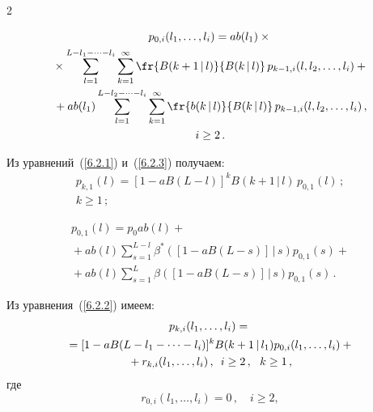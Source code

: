 \begin{multicols}{2}
\vspace*{-9pt}

\noindent
\begin{multline}
p_{0,i}(l_1,\ldots,l_i)
= a b(l_1)\times{}\\
{}\times 
\sum\limits_{l=1}^{L-l_1-\cdots-l_i}
\sum\limits_{k=1}^\infty
\fr{B(k+1\,|\,l) }{ B(k\,|\,l)}\,
p_{k-1,i}(l,l_2,\ldots,l_i)
 +{}
\\
{}+
a b(l_1) \sum\limits_{l=1}^{L-l_2-\cdots-l_i}
\sum\limits_{k=1}^\infty
\fr{b(k\,|\,l) }{B(k\,|\,l)}\,
p_{k-1,i}(l,l_2,\ldots,l_i)\,,
\\
i \ge 2\,.
\label{6.2.4}
\end{multline}

Из уравнений~(\ref{6.2.1}) и~(\ref{6.2.3}) получаем:
\begin{multline}
\label{6.2.5}
p_{k,1}(l)=
[1 - a B(L-l)]^k B(k+1\,|\,l)
\,p_{0,1}(l)\,;
\\ 
k\ge 1\,;
\end{multline}

\vspace*{-9pt}

\noindent
\begin{multline}
\label{6.2.6}
p_{0,1}(l)= p_0 a b(l)+{}\\
{}+
a b(l)\sum\limits_{s=1}^{L-l}
\beta^*([1 - a B(L-s)]\,|\,s)
p_{0,1}(s)
 +{}
\\
{}+
a b(l)
\sum\limits_{s=1}^{L}
\beta([1 - a B(L-s)]\,|\,s)
p_{0,1}(s)\,.
\end{multline}

Из уравнения~(\ref{6.2.2}) имеем:
\begin{multline}
p_{k,i}(l_1,\ldots,l_i)
={}\\
{}=[1 - a B(L-l_1-\cdots-l_i)]^k
B(k+1\,|\,l_1) p_{0,i}(l_1,\ldots,l_i)
+{}
\\
{}+r_{k,i}(l_1,\ldots,l_i)\,,
\enskip
i \ge 2\,,\ \ k\ge 1\,,
\label{6.2.7}
\end{multline}
где
\begin{equation}
\label{6.2.8}
r_{0,i}(l_1,\ldots,l_i)
= 0\,,\quad
i \ge 2,
\end{equation}

\vspace*{-9pt}


\end{multicols}

